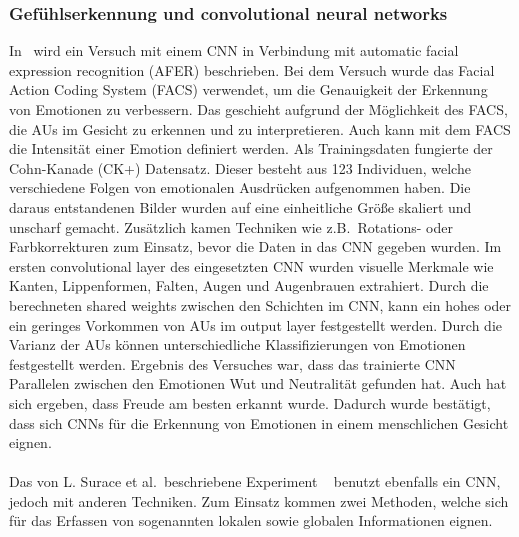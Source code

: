 \subsubsection*{Gefühlserkennung und convolutional neural networks}
In~\cite{facialemotionrecusingcnn} wird ein Versuch mit einem CNN in Verbindung mit automatic facial expression recognition (AFER) beschrieben. Bei dem Versuch wurde das Facial Action Coding System (FACS) verwendet, um die Genauigkeit der Erkennung von Emotionen zu verbessern. Das geschieht aufgrund der Möglichkeit des FACS, die AUs im Gesicht zu erkennen und zu interpretieren. Auch kann mit dem FACS die Intensität einer Emotion definiert werden. Als Trainingsdaten fungierte der Cohn-Kanade (CK+) Datensatz. Dieser besteht aus 123 Individuen, welche verschiedene Folgen von emotionalen Ausdrücken aufgenommen haben. Die daraus entstandenen Bilder wurden auf eine einheitliche Größe skaliert und unscharf gemacht. Zusätzlich kamen Techniken wie z.B.~Rotations- oder Farbkorrekturen zum Einsatz, bevor die Daten in das CNN gegeben wurden. Im ersten convolutional layer des eingesetzten CNN wurden visuelle Merkmale wie Kanten, Lippenformen, Falten, Augen und Augenbrauen extrahiert. Durch die berechneten shared weights zwischen den Schichten im CNN, kann ein hohes oder ein geringes Vorkommen von AUs im output layer festgestellt werden. Durch die Varianz der AUs können unterschiedliche Klassifizierungen von Emotionen festgestellt werden. Ergebnis des Versuches war, dass das trainierte CNN Parallelen zwischen den Emotionen Wut und Neutralität gefunden hat. Auch hat sich ergeben, dass Freude am besten erkannt wurde. Dadurch wurde bestätigt, dass sich CNNs für die Erkennung von Emotionen in einem menschlichen Gesicht eignen.
\\
\\
Das von L. Surace et al.~beschriebene Experiment ~\cite{wildemotionrec} benutzt ebenfalls ein CNN, jedoch mit anderen Techniken. Zum Einsatz kommen zwei Methoden, welche sich für das Erfassen von sogenannten lokalen sowie globalen Informationen eignen.\\
